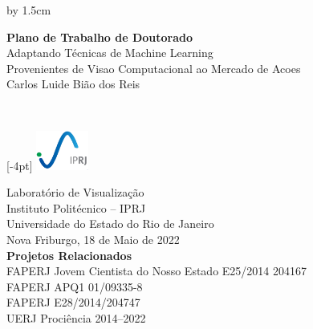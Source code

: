 \begin{titlepage}
\begin{changemargin}{-0.5cm}{-1cm}
\renewcommand{\title}{%
  {\LARGE Adaptando Técnicas de Machine Learning}\\[4pt]
  {\LARGE Provenientes de Visao Computacional ao Mercado de Acoes}
}
\renewcommand{\author}{Carlos Luide Bião dos Reis}
\newcommand{\info}{%
  \raisebox{4pt}[-4pt]{%
  \includegraphics[height=1.3cm]{figs/logo-iprj2.eps} 
  \hspace{0.1in}
  }

  Laboratório de Visualização\\
  Instituto Politécnico -- IPRJ\\
  Universidade do Estado do Rio de Janeiro\\[1.5cm]

  Nova Friburgo, 18 de Maio de 2022\\[1.5cm]

  \textbf{Projetos Relacionados}\\[4pt]
   FAPERJ Jovem Cientista do Nosso Estado E25/2014 204167\\
   FAPERJ APQ1 01/09335-8\\
   FAPERJ E28/2014/204747\\
   UERJ Prociência 2014--2022
}

\newlength{\topToTitle} 
\setlength{\topToTitle}{30pt}

\newlength{\leftToTitle} 
\setlength{\leftToTitle}{-50pt}

\newlength{\titleToInfo} 
\setlength{\titleToInfo}{7cm}

\newlength{\myTextWidth}
\setlength{\myTextWidth}{\textwidth}
\advance\myTextWidth by 1.5cm


\thispagestyle{empty}
\vspace*{\topToTitle}
\begin{minipage}{\myTextWidth}
  \sffamily
  \hspace*{\leftToTitle}\begin{minipage}{60cm}
    \Large\textbf{Plano de Trabalho de Doutorado}\\[1.5cm]
    \title\\[1.5cm]
    \author
  \end{minipage}\\

  \vspace*{\titleToInfo}

  \begin{minipage}{\textwidth}
    \flushright
    \info
  \end{minipage}
\end{minipage}%
\end{changemargin}
\end{titlepage}
